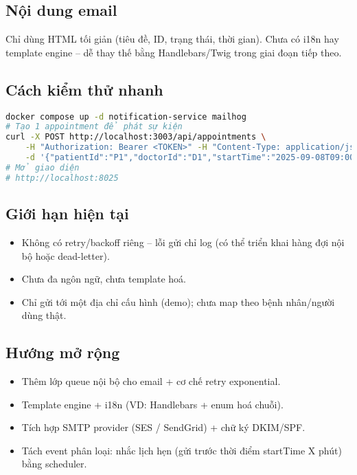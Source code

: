 \documentclass[12pt,a4paper]{report}
\begin{document}
\subsection*{Nội dung email}
Chỉ dùng HTML tối giản (tiêu đề, ID, trạng thái, thời gian). Chưa có i18n hay template engine – dễ thay thế bằng Handlebars/Twig trong giai đoạn tiếp theo.

\subsection*{Cách kiểm thử nhanh}
\begin{lstlisting}[language=bash]
docker compose up -d notification-service mailhog
# Tạo 1 appointment để phát sự kiện
curl -X POST http://localhost:3003/api/appointments \
    -H "Authorization: Bearer <TOKEN>" -H "Content-Type: application/json" \
    -d '{"patientId":"P1","doctorId":"D1","startTime":"2025-09-08T09:00:00Z","endTime":"2025-09-08T09:30:00Z"}'
# Mở giao diện
# http://localhost:8025
\end{lstlisting}

\subsection*{Giới hạn hiện tại}
\begin{itemize}
    \item Không có retry/backoff riêng – lỗi gửi chỉ log (có thể triển khai hàng đợi nội bộ hoặc dead-letter).
    \item Chưa đa ngôn ngữ, chưa template hoá.
    \item Chỉ gửi tới một địa chỉ cấu hình (demo); chưa map theo bệnh nhân/người dùng thật.
\end{itemize}

\subsection*{Hướng mở rộng}
\begin{itemize}
    \item Thêm lớp queue nội bộ cho email + cơ chế retry exponential.
    \item Template engine + i18n (VD: Handlebars + enum hoá chuỗi).
    \item Tích hợp SMTP provider (SES / SendGrid) + chữ ký DKIM/SPF.
    \item Tách event phân loại: nhắc lịch hẹn (gửi trước thời điểm startTime X phút) bằng scheduler.
\end{itemize}
\end{document}
